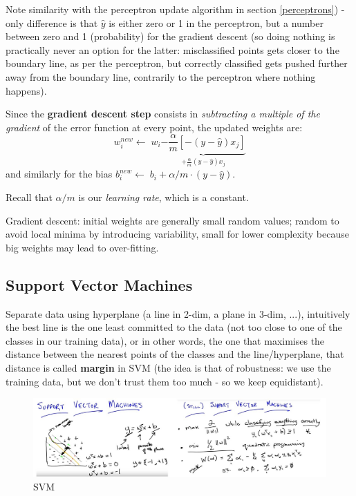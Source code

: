 \documentclass[11pt]{article}
\begin{document}
Note similarity with the perceptron update algorithm in section \ref{perceptrons}) - only difference is that $\hat{y}$ is either zero or 1 in the perceptron, but a number between zero and 1 (probability) for the gradient descent (so doing nothing is practically never an option for the latter: misclassified points gets closer to the boundary line, as per the perceptron, but correctly classified gets pushed further away from the boundary line, contrarily to the perceptron where nothing happens).

Since the \textbf{gradient descent step} consists in \textit{subtracting a multiple of the gradient} of the error function at every point, the updated weights are:
\[ w^{new}_i \leftarrow \; w_i \underbrace{- \frac{\alpha}{m} [-(y-\hat{y}) x_j]}_{+\frac{\alpha}{m} (y-\hat{y}) x_j}
\]
and similarly for the bias $b^{new}_i \leftarrow \; b_i + \alpha/m \cdot (y-\hat{y})$.

Recall that $\alpha/m$ is our \textit{learning rate}, which is a constant.

Gradient descent: initial weights are generally small random values; random to avoid local minima by introducing variability, small for lower complexity because big weights may lead to over-fitting.

\subsection{Support Vector Machines}
Separate data using hyperplane (a line in 2-dim, a plane in 3-dim, ...), intuitively the best line is the one least committed to the data (not too close to one of the classes in our training data), or in other words, the one that maximises the distance between the nearest points of the classes and the line/hyperplane, that distance is called \textbf{margin} in SVM (the idea is that of robustness: we use the training data, but we don't trust them too much - so we keep equidistant).
\begin{figure}[htbp] 
	\centering
	\includegraphics[width=1.\textwidth]{pics/SVM}
	\caption{SVM} 
	\label{SVM}
\end{figure}
\end{document}
